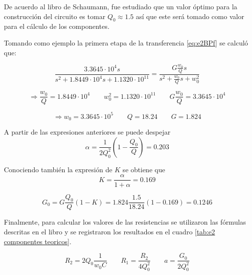 De acuerdo al libro de Schaumann, fue estudiado que un valor óptimo para la construcción del circuito es tomar $Q_0 \approx 1.5$ así que este será tomado como valor para el cálculo de los componentes.

Tomando como ejemplo la primera etapa de la transferencia \eqref{eq:e2BPf} se calculó que:

\begin{equation}
\frac{3.3645\cdot 10^4s}{s^2 + 1.8449\cdot10^4 s + 1.1320\cdot10^{11}} = \frac{ G \frac{w_0}{Q}s }{s^2+ \frac{w_0}{Q}s+w_0^2}
\end{equation}

\begin{equation*}
\Rightarrow \frac{w_0}{Q}= 1.8449\cdot10^4	\qquad w_0^2=1.1320\cdot10^{11} \qquad	G \frac{w_0}{Q}=3.3645\cdot 10^4
\end{equation*}

\begin{equation}
\Rightarrow w_0=3.3645\cdot10^5 \qquad	Q=18.24 \qquad	G=1.824
\end{equation}

A partir de las expresiones anteriores se puede despejar
\begin{equation*}
\alpha=\frac{1}{2Q_0^2}\left(1-\frac{Q_0}{Q}\right) = 0.203
\end{equation*}

Conociendo también la expresión de $K$ se obtiene que
\begin{equation*}
K=\frac{\alpha}{1+\alpha} = 0.169
\end{equation*}

\begin{equation*}
G_0=G\frac{Q_0}{Q}(1-K) = 1.824\frac{1.5}{18.24}(1-0.169)=0.1246
\end{equation*}

Finalmente, para calcular los valores de las resistencias se utilizaron las fórmulas descritas en el libro y se registraron los resultados en el cuadro \ref{tab:e2 componentes teoricos}.

\begin{equation}
R_2=2Q_0\frac{1}{w_0C} \qquad R_1=\frac{R_2}{4Q_0^2} \qquad a=\frac{G_0}{2Q_0^2}
\end{equation}

